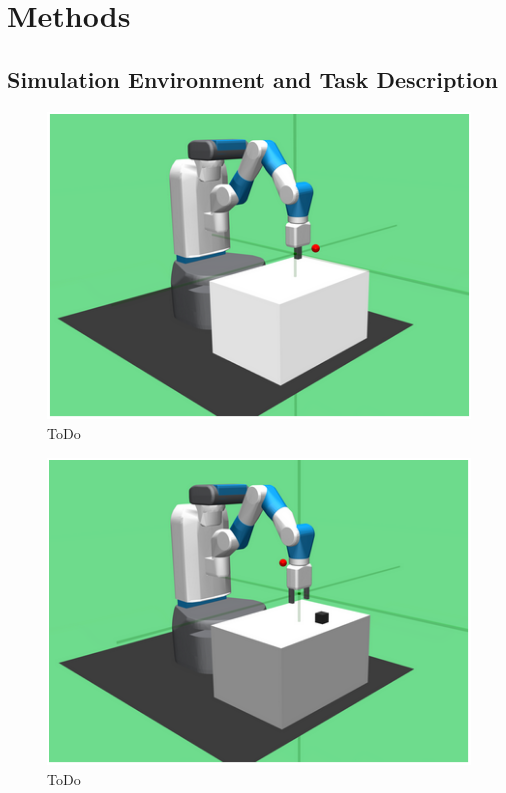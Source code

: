 \section{Methods} \label{section:methods}

\subsection{Simulation Environment and Task Description}

\begin{figure}[h!]
    \centering
    \includegraphics{images/FR.png}
    \caption{ToDo}
    \label{fig:HER}
\end{figure}

\begin{figure}[h!]
    \centering
    \includegraphics{images/FPAP.png}
    \caption{ToDo}
    \label{fig:HER}
\end{figure}

